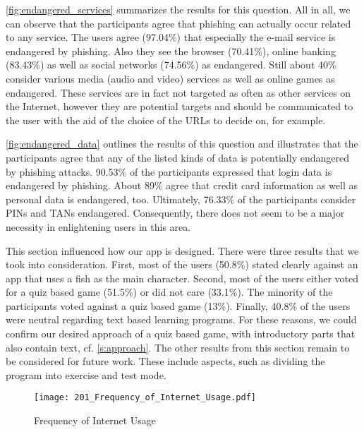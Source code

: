 \begin{description}[leftmargin=0cm]
	\item[Services endangered by phishing] \autoref{fig:endangered_services} summarizes the results for this question.
 All in all, we can observe that the participants agree that phishing can actually occur related to any service.
 The users agree (97.04\%) that especially the e-mail service is endangered by phishing.
 Also they see the browser (70.41\%), online banking (83.43\%) as well as social networks (74.56\%) as endangered.
 Still about 40\% consider various media (audio and video) services as well as online games as endangered.
 These services are in fact not targeted as often as other services on the Internet, however they are potential targets and should be communicated to the user with the aid of the choice of the URLs to decide on, for example.

	\item[Data endangered by phishing] \autoref{fig:endangered_data} outlines the results of this question and illustrates that the participants agree that any of the listed kinds of data is potentially endangered by phishing attacks.
 90.53\% of the participants expressed that login data is endangered by phishing.
 About 89\% agree that credit card information as well as personal data is endangered, too.
 Ultimately, 76.33\% of the participants consider PINs and TANs endangered.
 Consequently, there does not seem to be a major necessity in enlightening users in this area.

	\item[Preferences for an education app] This section influenced how our app is designed. There were three results that we took into consideration.
	First, most of the users (50.8\%) stated clearly against an app that uses a fish as the main character. 
	Second, most of the users either voted for a quiz based game (51.5\%) or did not care (33.1\%).
	The minority of the participants voted against a quiz based game (13\%).
	Finally, 40.8\% of the users were neutral regarding text based learning programs.
	For these reasons, we could confirm our desired approach of a quiz based game, with introductory parts that also contain text, cf. \autoref{s:approach}.
	The other results from this section remain to be considered for future work.
	These include aspects, such as dividing the program into exercise and test mode.
\end{description}


\begin{figure}[hHtbp]
\centering
\texttt{[image: 201\_Frequency\_of\_Internet\_Usage.pdf]}
\caption{Frequency of Internet Usage}
\label{fig:internet_usage}
\end{figure}


